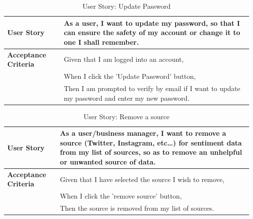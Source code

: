 \documentclass[12pt]{article}
\begin{document}
\begin{table}[htbp]
  \caption{User Story: Update Password}
  \begin{tabular}{|p{}|p{}|}
    \hline
    \textbf{User Story}          & As a user, I want to update my password, so that I can ensure the safety of my account or change it to one I shall remember. \\
    \hline
    \textbf{Acceptance Criteria} &
    Given that I am logged into an account,                                                                                                                     \\
                                 & When I click the 'Update Password' button,                                                                                   \\
                                 & Then I am prompted to verify by email if I want to update my password and enter my new password.                             \\
    \hline
  \end{tabular}
\end{table}
\begin{table}[htbp]
  \caption{User Story: Remove a source}
  \begin{tabular}{|p{}|p{}|}
    \hline
    \textbf{User Story}          & As a user/business manager, I want to remove a source (Twitter, Instagram, etc…) for sentiment data from my list of sources, so as to remove an unhelpful or unwanted source of data. \\
    \hline
    \textbf{Acceptance Criteria} &
    Given that I have selected the source I wish to remove,                                                                                                                                                              \\
                                 & When I click the 'remove source' button,                                                                                                                                              \\
                                 & Then the source is removed from my list of sources.                                                                                                                                   \\
    \hline
  \end{tabular}
\end{table}
\end{document}
